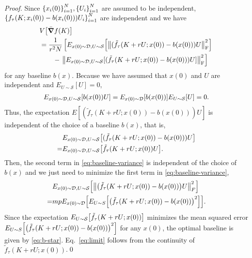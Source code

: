 \begin{proof}
  Since $\qty{x_i(0)}_{i=1}^N, \qty{U_i}_{i=1}^N$ are assumed to be independent, $\qty{f_\tau(K;x_i(0))-b(x_i(0)))U_i}_{i=1}^N$ are independent and we have
  \begin{align}
    &V\qty[\bar \grad f(K)] \label{eq:baseline-variance}\\
                           &= \frac{1}{r^2N}\left[E_{x(0)\sim \mathcal{D}, U\sim \mathcal{S} }\qty[\norm{(\tilde f_\tau(K+rU;x(0))-b(x(0)))U}_\mathrm{F}^2]\right.        \\
                           & \quad\quad-\left.\norm{E_{x(0)\sim \mathcal{D}, U\sim \mathcal{S} }[(\tilde f_\tau(K+rU;x(0))-b(x(0)))U]}_\mathrm{F}^2\right]\nonumber
  \end{align}
  for any baseline $b(x)$.
  Because we have assumed that $x(0)$ and $U$ are independent and $E_{U\sim \mathcal{S}}[U] = 0$,
  \begin{align}
      E_{x(0)\sim \mathcal{D}, U\sim \mathcal{S}}\qty[b(x(0))U] = E_{x(0) \sim \mathcal{D}}\qty[b(x(0))]E_{U\sim \mathcal{S}}[U] = 0.
  \end{align}
  Thus, the expectation $E[(\tilde{f}_\tau(K+rU;x(0))-b(x(0)))U]$ is independent of the choice of a baseline $b(x)$,
  that is,
  \begin{align}
& E_{x(0)\sim \mathcal{D}, U \sim \mathcal{S}}\qty[(\tilde f_\tau(K+rU;x(0))-b(x(0)))U] \\ =& E_{x(0)\sim \mathcal{D}, U \sim \mathcal{S}}\qty[\tilde f_\tau(K+rU;x(0))U].
  \end{align}
  Then, the second term in \eqref{eq:baseline-variance} is independent of the choice of $b(x)$ and we just need to minimize the first term in \eqref{eq:baseline-variance},
  \begin{align}
    & E_{x(0) \sim \mathcal{D}, U\sim \mathcal{S}}\qty[\norm{\qty(\tilde f_\tau(K+rU;x(0))-b(x(0)))U}^2_F] \\
     =& mp E_{x(0)\sim \mathcal{D}}\qty[E_{U\sim S}\qty[\qty(\tilde f_\tau(K+rU;x(0))-b(x(0)))^2]].
  \end{align}
  Since the expectation $E_{U\sim \mathcal{S}}\qty[\tilde f_\tau(K+rU;x(0))]$ minimizes the mean squared error $E_{U\sim S}\qty[\qty(\tilde f_\tau(K+rU;x(0))-b(x(0)))^2]$ for any $x(0)$, 
  the optimal baseline is given by \eqref{eq:b-star}.
  Eq.~\eqref{eq:limit} follows from the continuity of $\tilde f_\tau(K+rU;x(0))$.\qed
\end{proof}

